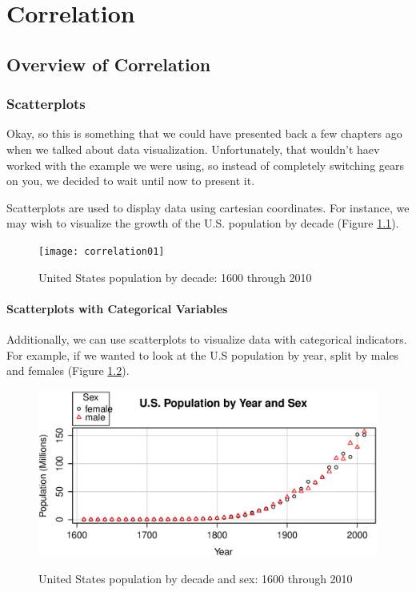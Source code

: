 
\chapter{Correlation}

\section{Overview of Correlation}

\subsection{Scatterplots}
Okay, so this is something that we could have presented back a few chapters ago when we talked about data visualization. Unfortunately, that wouldn't haev worked with the example we were using, so instead of completely switching gears on you, we decided to wait until now to present it.

Scatterplots are used to display data using cartesian coordinates. For instance, we may wish to visualize the growth of the U.S. population by decade (Figure \ref{fig:correlation01}).

\begin{figure}
\texttt{[image: correlation01]}
\label{fig:correlation01}
\caption{United States population by decade: 1600 through 2010}
\end{figure}

\subsubsection{Scatterplots with Categorical Variables}
Additionally, we can use scatterplots to visualize data with categorical indicators. For example, if we wanted to look at the U.S population by year, split by males and females (Figure \ref{fig:correlation02}).

\begin{figure}
\includegraphics[width=35pc]{assets/correlation02}
\label{fig:correlation02}
\caption{United States population by decade and sex: 1600 through 2010}
\end{figure}

